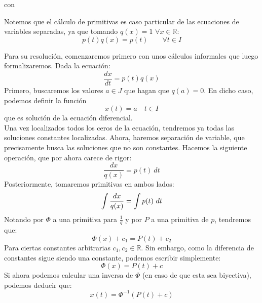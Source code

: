 con

\begin{observacion}
Notemos que el cálculo de primitivas es caso particular de las ecuaciones de variables separadas, ya que tomando $q(x) = 1$ $\forall x\in \mathbb{R}$:
\begin{equation*}
    p(t)q(x) = p(t) \qquad \forall t\in I
\end{equation*}
\end{observacion}
Para su resolución, comenzaremos primero con unos cálculos informales que luego formalizaremos. Dada la ecuación:
\begin{equation*}
    \dfrac{dx}{dt} = p(t)q(x)
\end{equation*}
Primero, buscaremos los valores $a\in J$ que hagan que $q(a) = 0$. En dicho caso, podemos definir la función
\begin{equation*}
    x(t) = a \quad t\in I
\end{equation*}
que es solución de la ecuación diferencial. \\

Una vez localizados todos los ceros de la ecuación, tendremos ya todas las soluciones constantes localizadas. Ahora, haremos separación de variable, que precisamente busca las soluciones que no son constantes. Hacemos la siguiente operación, que por ahora carece de rigor:
\begin{equation*}
    \dfrac{dx}{q(x)} = p(t)~dt
\end{equation*}
Posteriormente, tomaremos primitivas en ambos lados:
\begin{equation*}
    \int\dfrac{dx}{q(x)} = \int p(t)~dt \\
\end{equation*}
Notando por $\Phi$ a una primitiva para $\frac{1}{q}$ y por $P$ a una primitiva de $p$, tendremos que:
\begin{equation*}
    \Phi(x)+c_1 = P(t) + c_2
\end{equation*}
Para ciertas constantes arbitrarias $c_1,c_2\in \mathbb{R}$. Sin embargo, como la diferencia de constantes sigue siendo una constante, podemos escribir simplemente:
\begin{equation*}
    \Phi(x)= P(t) + c
\end{equation*}
Si ahora podemos calcular una inversa de $\Phi$ (en caso de que esta sea biyectiva), podemos deducir que:
\begin{equation*}
    x(t) = \Phi^{-1}(P(t)+c)
\end{equation*}

